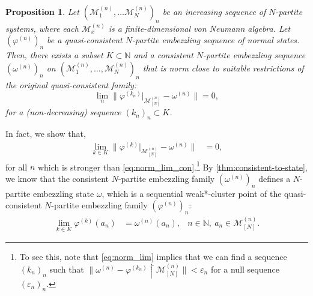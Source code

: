 \documentclass[a4paper, 10pt, onecolumn, accepted=2025-07-22]{quantumarticle}
\newtheorem{proposition}[theorem]{Proposition}
\theoremstyle{definition}
\newcommand{\norm}[1]{\lVert #1\rVert}
\newcommand{\mc}{\mathcal}
\newcommand{\eps}{\varepsilon}
\newcommand{\up}[1]{^{(#1)}}
\def\M{{\mc M}}
\def\NN{{\mathbb N}}
\newcommand*{\1}{\text{\usefont{U}{bbold}{m}{n}1}}
\begin{document}
\begin{proposition}
\label{prop:lim_con_fam}
    Let $(\M\up{n}_1,\ldots\M\up{n}_N)_{n}$ be an increasing sequence of $N$-partite systems, where each $\M\up{n}_x$ is a finite-dimensional von Neumann algebra. Let $(\varphi\up{n})_{n}$ be a quasi-consistent  $N$-partite embezzling sequence of normal states. 
    Then, there exists a subset $K\subset \NN$ and a consistent $N$-partite embezzling sequence $(\omega\up n)_{n}$ on $(\M\up{n}_1,\ldots,\M\up{n}_N)_{n}$ that is norm close to suitable restrictions of the original quasi-consistent family:
    \begin{equation}
    \label{eq:norm_lim_con}
        \lim_{n}\norm{\varphi\up{k_{n}}|_{\M\up{n}_{[N]}}-\omega\up{n}} = 0,
    \end{equation}
    for a (non-decreasing) sequence $(k_{n})_{n}\subset K$.
\end{proposition} 

In fact, we show that,
\begin{align}
\label{eq:norm_lim}
    \lim_{k\in K} \norm{\varphi\up{k}|_{\M\up{n}_{[N]}}-\omega\up{n}} & = 0,
\end{align}
for all $n$ which is stronger than \cref{eq:norm_lim_con}.\footnote{\label{ft:norm_lim} To see this, note that \cref{eq:norm_lim} implies that we can find a sequence $(k_{n})_n$ such that $\norm{\omega\up{n}-\varphi\up{k_{n}}\restriction \M\up{n}_{[N]}}<\eps_{n}$ for a null sequence $(\eps_{n})_{n}$.}
By \cref{thm:consistent-to-state}, we know that the consistent $N$-partite embezzling family $(\omega\up{n})_{n}$ defines a $N$-partite embezzling state $\omega$, which is a sequential weak*-cluster point of the quasi-consistent $N$-partite embezzling family $(\varphi\up{n})_{n}$:
\begin{align}
    \lim_{k\in K}\varphi\up{k}(a_{n}) & = \omega\up{n}(a_{n}), & n\in\NN,\  a_{n}\in\M\up{n}_{[N]}.
\end{align}
\end{document}
